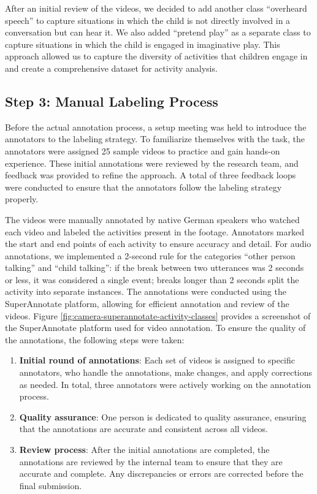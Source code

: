 \documentclass[
  man,floatsintext]{apa6}
\providecommand{\tightlist}{%
  \setlength{\itemsep}{0pt}\setlength{\parskip}{0pt}}
\begin{document}
After an initial review of the videos, we decided to add another class ``overheard speech'' to capture situations in which the child is not directly involved in a conversation but can hear it. We also added ``pretend play'' as a separate class to capture situations in which the child is engaged in imaginative play. This approach allowed us to capture the diversity of activities that children engage in and create a comprehensive dataset for activity analysis.

\subsection{Step 3: Manual Labeling Process}\label{step-3-manual-labeling-process}

Before the actual annotation process, a setup meeting was held to introduce the annotators to the labeling strategy. To familiarize themselves with the task, the annotators were assigned 25 sample videos to practice and gain hands-on experience. These initial annotations were reviewed by the research team, and feedback was provided to refine the approach. A total of three feedback loops were conducted to ensure that the annotators follow the labeling strategy properly.

The videos were manually annotated by native German speakers who watched each video and labeled the activities present in the footage. Annotators marked the start and end points of each activity to ensure accuracy and detail. For audio annotations, we implemented a 2-second rule for the categories ``other person talking'' and ``child talking'': if the break between two utterances was 2 seconds or less, it was considered a single event; breaks longer than 2 seconds split the activity into separate instances. The annotations were conducted using the SuperAnnotate platform, allowing for efficient annotation and review of the videos. Figure \ref{fig:camera-superannotate-activity-classes} provides a screenshot of the SuperAnnotate platform used for video annotation. To ensure the quality of the annotations, the following steps were taken:

\begin{enumerate}
\def\labelenumi{\arabic{enumi}.}
\tightlist
\item
  \textbf{Initial round of annotations}: Each set of videos is assigned to specific annotators, who handle the annotations, make changes, and apply corrections as needed. In total, three annotators were actively working on the annotation process.
\item
  \textbf{Quality assurance}: One person is dedicated to quality assurance, ensuring that the annotations are accurate and consistent across all videos.
\item
  \textbf{Review process}: After the initial annotations are completed, the annotations are reviewed by the internal team to ensure that they are accurate and complete. Any discrepancies or errors are corrected before the final submission.
\end{enumerate}
\end{document}
